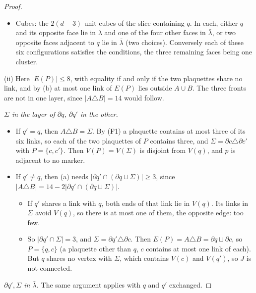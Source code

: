 \documentclass[11pt,a4paper]{article}
\theoremstyle{definition}
\theoremstyle{remark}
\newcommand{\Z}{\mathbb{Z}}
\begin{document}
\begin{proof}
\begin{itemize}
transitively on the plaquettes, so both counts per plaquette are constant, equal to the local counts of $\Z^{d-1}$. Hence the triples with $a=q$ are as many as those with $b=q$,
which are $2\nu_2$.
\item Cubes: the $2(d-3)$ unit cubes of the slice containing $q$. In each, either $q$ and its opposite face lie in $\lambda$ and one of the four other faces in $\bar\lambda$, or two
opposite faces adjacent to $q$ lie in $\bar\lambda$ (two choices). Conversely each of these six configurations satisfies the conditions, the three remaining faces being one cluster.
\end{itemize}

(ii) Here $|E(P)|\le8$, with equality if and only if the two plaquettes share no link, and by (b) at most one link of $E(P)$ lies outside $A\cup B$. The three fronts are not in one layer,
since $|A\triangle B|=14$ would follow.

\emph{$\Sigma$ in the layer of $\partial q$, $\partial q'$ in the other.}
\begin{itemize}
\item If $q'=q$, then $A\triangle B=\Sigma$. By (F1) a plaquette contains at most three of its six links, so each of the two plaquettes of $P$ contains three, and
$\Sigma=\partial c\triangle\partial c'$ with $P=\{c,c'\}$. Then
$V(P)=V(\Sigma)$ is disjoint from $V(q)$, and $p$ is adjacent to no marker.
\item If $q'\ne q$, then (a) needs $|\partial q'\cap(\partial q\sqcup\Sigma)|\ge3$, since $|A\triangle B|=14-2|\partial q'\cap(\partial q\sqcup\Sigma)|$.
\begin{itemize}
\item If $q'$ shares a link with $q$, both ends of that link lie in $V(q)$. Its links in $\Sigma$ avoid $V(q)$, so there is at most one of them, the opposite edge: too few.
\item So $|\partial q'\cap\Sigma|=3$, and $\Sigma=\partial q'\triangle\partial c$. Then $E(P)=A\triangle B=\partial q\sqcup\partial c$, so $P=\{q,c\}$ (a plaquette other than $q$, $c$
contains at most one link of each). But $q$ shares no vertex with $\Sigma$,
which contains $V(c)$ and $V(q')$, so $J$ is not connected.
\end{itemize}
\end{itemize}
\emph{$\partial q',\Sigma$ in $\bar\lambda$.} The same argument applies with $q$ and $q'$ exchanged.


\end{proof}
\end{document}
